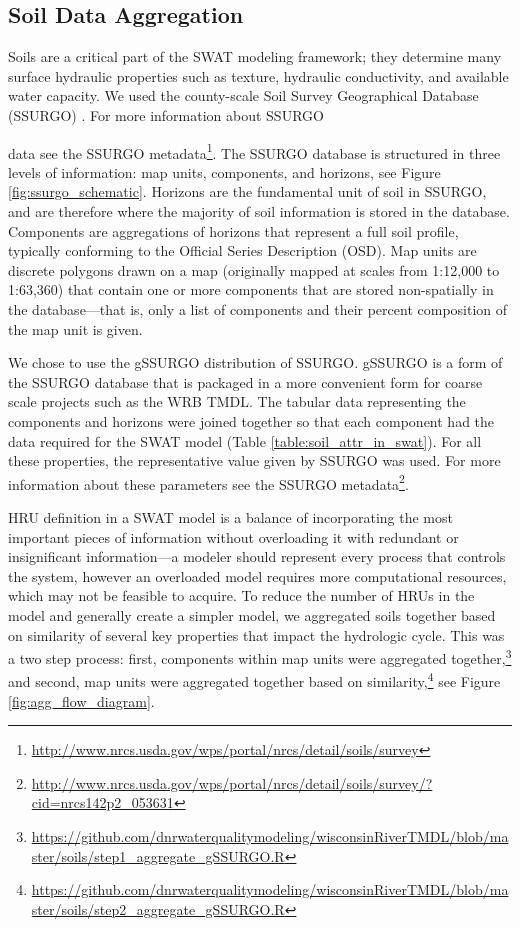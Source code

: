 \subsection{Soil Data Aggregation}\label{sec:soils}

Soils are a critical part of the SWAT modeling framework; they determine many
surface hydraulic properties such as texture, hydraulic conductivity, and
available water capacity. We used the county-scale Soil Survey Geographical
Database (SSURGO) . For more information about SSURGO

data see the SSURGO metadata\footnote{\url{http://www.nrcs.usda.gov/wps/portal/nrcs/detail/soils/survey}}.
The SSURGO database is structured in three levels of information: map units,
components, and horizons, see Figure \ref{fig:ssurgo_schematic}. Horizons are the fundamental unit of soil in SSURGO, and are
therefore where the majority of soil information is stored in the database.
Components are aggregations of horizons that represent a full soil profile,
typically conforming to the Official Series Description (OSD). Map units
are discrete polygons drawn on a map (originally mapped at scales from 1:12,000
to 1:63,360) that contain one or more components that are stored non-spatially
in the database---that is, only a list of components and their percent
composition of the map unit is given. 

We chose to use the gSSURGO distribution of SSURGO. gSSURGO is a form of the SSURGO database that is packaged in a more convenient form for coarse scale projects such as the WRB TMDL. The tabular data representing the components and
horizons were joined together so that each component had the data required for
the SWAT model (Table \ref{table:soil_attr_in_swat}). For all these properties, the representative value given by
SSURGO was used. For more information about these parameters see the SSURGO
metadata\footnote{\url{http://www.nrcs.usda.gov/wps/portal/nrcs/detail/soils/survey/?cid=nrcs142p2_053631}}.

HRU definition in a SWAT model is a balance of incorporating the most important
pieces of information without overloading it with redundant or insignificant
information---a modeler should represent every process that controls the system,
however an overloaded model requires more computational resources, which may not
be feasible to acquire. To reduce the number of HRUs in the model and generally create a 
simpler model, we aggregated
soils together based on similarity of several key properties that impact the
hydrologic cycle. This was a two step process: first, components within map
units were aggregated
together,\footnote{\url{https://github.com/dnrwaterqualitymodeling/wisconsinRiverTMDL/blob/master/soils/step1_aggregate_gSSURGO.R} } 
and second, map units were aggregated together based on
similarity,\footnote{\url{https://github.com/dnrwaterqualitymodeling/wisconsinRiverTMDL/blob/master/soils/step2_aggregate_gSSURGO.R}} see Figure \ref{fig:agg_flow_diagram}.

